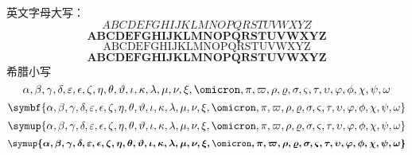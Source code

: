 \documentclass{article}
\begin{document}
英文字母大写：
\begin{equation}
  ABCDEFGHIJKLMNOPQRSTUVWXYZ 
\end{equation}
\begin{equation}
  \boldsymbol{ABCDEFGHIJKLMNOPQRSTUVWXYZ} 
\end{equation}
\begin{equation}
  \mathrm{ABCDEFGHIJKLMNOPQRSTUVWXYZ}
\end{equation}
\begin{equation}
  \mathbf{ABCDEFGHIJKLMNOPQRSTUVWXYZ}
\end{equation}
\clearpage
希腊小写
\begin{equation}
    \alpha, \beta, \gamma, \delta, \varepsilon, \epsilon, \zeta, \eta, \theta, \vartheta, \iota, \kappa, \lambda, \mu, \nu, \xi, \omicron, \pi ,\varpi, \rho, \varrho, \sigma, \varsigma, \tau, \upsilon, \varphi, \phi, \chi, \psi, \omega
\end{equation}
\begin{equation}
  \symbf{\alpha, \beta, \gamma, \delta, \varepsilon, \epsilon, \zeta, \eta, \theta, \vartheta, \iota, \kappa, \lambda, \mu, \nu, \xi, \omicron, \pi ,\varpi, \rho, \varrho, \sigma, \varsigma, \tau, \upsilon, \varphi, \phi, \chi, \psi, \omega}
\end{equation}
\begin{equation}
  \symup{\alpha, \beta, \gamma, \delta, \varepsilon, \epsilon, \zeta, \eta, \theta, \vartheta, \iota, \kappa, \lambda, \mu, \nu, \xi, \omicron, \pi ,\varpi, \rho, \varrho, \sigma, \varsigma, \tau, \upsilon, \varphi, \phi, \chi, \psi, \omega}
\end{equation}
\begin{equation}
  \boldsymbol{\symup{\alpha, \beta, \gamma, \delta, \varepsilon, \epsilon, \zeta, \eta, \theta, \vartheta, \iota, \kappa, \lambda, \mu, \nu, \xi, \omicron, \pi ,\varpi, \rho, \varrho, \sigma, \varsigma, \tau, \upsilon, \varphi, \phi, \chi, \psi, \omega}} %
\end{equation}
\end{document}
